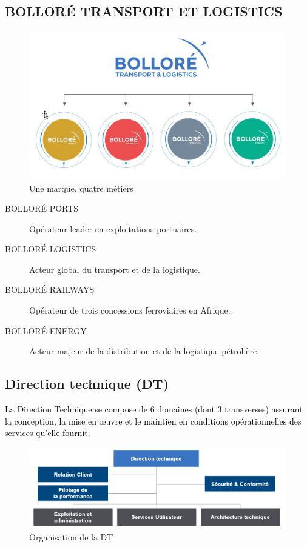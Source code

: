 \subsection{BOLLORÉ TRANSPORT ET LOGISTICS}
\vspace{-0.5cm}
\begin{figure}[H]
	\begin{center}
		\includegraphics[width=0.55\linewidth]{images_BOLLORE/BTL}
	\end{center}
		\caption{Une marque, quatre métiers}
	\label{fig:2}	
\end{figure}

\begin{description}
	\item [BOLLORÉ PORTS] Opérateur leader en exploitations portuaires.
	\item [BOLLORÉ LOGISTICS] Acteur global du transport et de la logistique.
	\item [BOLLORÉ RAILWAYS]  Opérateur de trois concessions ferroviaires en Afrique.
	\item [BOLLORÉ ENERGY] Acteur majeur de la distribution et de la logistique pétrolière.
\end{description}

\subsection{Direction technique (DT) }
\textcolor{black}{La Direction Technique se compose de 6 domaines (dont 3 transverses) assurant la conception, la mise en œuvre et le maintien en conditions opérationnelles des services qu’elle fournit.}
\begin{figure}[H]
	\begin{center}
			\includegraphics[width=1\linewidth]{images_BOLLORE/DT}
	\end{center}
	\caption{Organisation de la DT}
	\label{fig:3}	
\end{figure}

